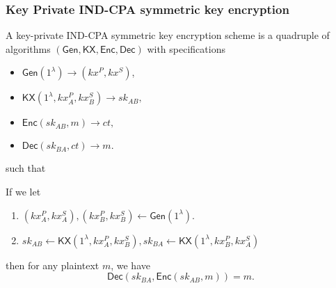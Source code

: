 \documentclass[sigconf, nonacm, balance=false, natbib=false, screen]{acmart}
\newcommand{\gen}{\mathsf{Gen}}
\newcommand{\enc}{\mathsf{Enc}}
\newcommand{\dec}{\mathsf{Dec}}
\begin{document}
\subsubsection{Key Private IND-CPA symmetric key encryption}
A key-private IND-CPA symmetric key encryption scheme is a quadruple of algorithms $(\gen, \mathsf{KX}, \enc, \dec)$ with specifications
\begin{itemize}
    \item $\gen(1^{\lambda}) \to (kx^P, kx^S)$,
    \item $\mathsf{KX}(1^{\lambda}, kx_A^P, kx_B^S) \to sk_{AB},$
    \item $\enc(sk_{AB}, m) \to ct,$
    \item $\dec(sk_{BA}, ct) \to m.$
\end{itemize}
such that 
\begin{definition}[Correctness]
If we let
\begin{enumerate}
    \item $(kx^P_A, kx_A^S), (kx^P_B, kx_B^S)  \leftarrow \gen(1^{\lambda}).$
    \item $sk_{AB} \leftarrow \mathsf{KX}(1^{\lambda}, kx_A^P, kx_B^S), sk_{BA} \leftarrow \mathsf{KX}(1^{\lambda}, kx_B^P, kx_A^S)$
\end{enumerate}
then for any plaintext $m$, we have
$$\dec(sk_{BA}, \enc(sk_{AB}, m)) = m.$$
\end{definition}
\end{document}

